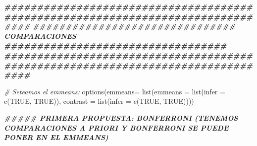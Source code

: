 \documentclass[
]{article}
\newenvironment{Shaded}{\begin{snugshade}}{\end{snugshade}}
\newcommand{\AttributeTok}[1]{\textcolor[rgb]{0.77,0.63,0.00}{#1}}
\newcommand{\CommentTok}[1]{\textcolor[rgb]{0.56,0.35,0.01}{\textit{#1}}}
\newcommand{\ConstantTok}[1]{\textcolor[rgb]{0.00,0.00,0.00}{#1}}
\newcommand{\DocumentationTok}[1]{\textcolor[rgb]{0.56,0.35,0.01}{\textbf{\textit{#1}}}}
\newcommand{\FunctionTok}[1]{\textcolor[rgb]{0.00,0.00,0.00}{#1}}
\newcommand{\NormalTok}[1]{#1}
\begin{document}
\begin{Shaded}
\begin{Highlighting}[]
\DocumentationTok{\#\#\#\#\#\#\#\#\#\#\#\#\#\#\#\#\#\#\#\#\#\#\#\#\#\#\#\#\#\#\#\#\#\#\#\#\#\#\#\#\#\#\#\#\#\#\#\#\#\#\#\#\#\#\#\#\#\#\#\#\#\#\#\#\#\#\#\#\#\#\#\#\#\#\#\#\#\#\#\#}
\DocumentationTok{\#\#\#\#\#\#\#\#\#\#\#\#\#\#\#\#\#\#\#\#\#\#\#\#\#\#\#\#\#\#\# COMPARACIONES \#\#\#\#\#\#\#\#\#\#\#\#\#\#\#\#\#\#\#\#\#\#\#\#\#\#\#\#\#\#\#\#\#\#}
\DocumentationTok{\#\#\#\#\#\#\#\#\#\#\#\#\#\#\#\#\#\#\#\#\#\#\#\#\#\#\#\#\#\#\#\#\#\#\#\#\#\#\#\#\#\#\#\#\#\#\#\#\#\#\#\#\#\#\#\#\#\#\#\#\#\#\#\#\#\#\#\#\#\#\#\#\#\#\#\#\#\#\#\#}

\CommentTok{\# Seteamos el emmeans:}
\FunctionTok{options}\NormalTok{(}\AttributeTok{emmeans=} \FunctionTok{list}\NormalTok{(}\AttributeTok{emmeans =} \FunctionTok{list}\NormalTok{(}\AttributeTok{infer =} \FunctionTok{c}\NormalTok{(}\ConstantTok{TRUE}\NormalTok{, }\ConstantTok{TRUE}\NormalTok{)),}
                      \AttributeTok{contrast =} \FunctionTok{list}\NormalTok{(}\AttributeTok{infer =} \FunctionTok{c}\NormalTok{(}\ConstantTok{TRUE}\NormalTok{, }\ConstantTok{TRUE}\NormalTok{))))}

\DocumentationTok{\#\#\#\#\# PRIMERA PROPUESTA: BONFERRONI (TENEMOS COMPARACIONES A PRIORI Y BONFERRONI SE PUEDE PONER EN EL EMMEANS)}


\end{Highlighting}
\end{Shaded}
\end{document}
